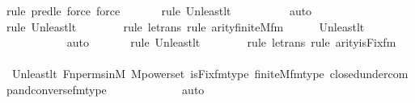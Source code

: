 \begin{isabellebody}
{\isacharparenleft}{\kern0pt}rule\ pred{\isacharunderscore}{\kern0pt}le{\isacharcomma}{\kern0pt}\ force{\isacharcomma}{\kern0pt}\ force{\isacharparenright}{\kern0pt}{\isacharplus}{\kern0pt}\isanewline
\ \ \ \ \ \ \isamarkupfalse%
{\isacharparenleft}{\kern0pt}rule\ Un{\isacharunderscore}{\kern0pt}least{\isacharunderscore}{\kern0pt}lt{\isacharparenright}{\kern0pt}{\isacharplus}{\kern0pt}\isanewline
\ \ \ \ \ \ \ \ \isamarkupfalse%
\ auto{\isacharbrackleft}{\kern0pt}{}{\isacharbrackright}{\kern0pt}\isanewline
\ \ \ \ \ \ \isamarkupfalse%
{\isacharparenleft}{\kern0pt}rule\ Un{\isacharunderscore}{\kern0pt}least{\isacharunderscore}{\kern0pt}lt{\isacharparenright}{\kern0pt}\isanewline
\ \ \ \ \ \ \ \isamarkupfalse%
{\isacharparenleft}{\kern0pt}rule\ le{\isacharunderscore}{\kern0pt}trans{\isacharcomma}{\kern0pt}\ rule\ arity{\isacharunderscore}{\kern0pt}finite{\isacharunderscore}{\kern0pt}M{\isacharunderscore}{\kern0pt}fm{\isacharparenright}{\kern0pt}\isanewline
\ \ \ \ \isamarkupfalse%
\ Un{\isacharunderscore}{\kern0pt}least{\isacharunderscore}{\kern0pt}lt\ \isanewline
\ \ \ \ \ \ \ \ \ \isamarkupfalse%
\ auto{\isacharbrackleft}{\kern0pt}{}{\isacharbrackright}{\kern0pt}\isanewline
\ \ \ \ \ \ \isamarkupfalse%
{\isacharparenleft}{\kern0pt}rule\ Un{\isacharunderscore}{\kern0pt}least{\isacharunderscore}{\kern0pt}lt{\isacharparenright}{\kern0pt}\isanewline
\ \ \ \ \ \ \ \isamarkupfalse%
{\isacharparenleft}{\kern0pt}rule\ le{\isacharunderscore}{\kern0pt}trans{\isacharcomma}{\kern0pt}\ rule\ arity{\isacharunderscore}{\kern0pt}is{\isacharunderscore}{\kern0pt}Fix{\isacharunderscore}{\kern0pt}fm{\isacharparenright}{\kern0pt}\isanewline
\ \ \ \ \isamarkupfalse%
\ Un{\isacharunderscore}{\kern0pt}least{\isacharunderscore}{\kern0pt}lt\ Fn{\isacharunderscore}{\kern0pt}perms{\isacharunderscore}{\kern0pt}in{\isacharunderscore}{\kern0pt}M\ M{\isacharunderscore}{\kern0pt}powerset\ is{\isacharunderscore}{\kern0pt}Fix{\isacharunderscore}{\kern0pt}fm{\isacharunderscore}{\kern0pt}type\ finite{\isacharunderscore}{\kern0pt}M{\isacharunderscore}{\kern0pt}fm{\isacharunderscore}{\kern0pt}type\ closed{\isacharunderscore}{\kern0pt}under{\isacharunderscore}{\kern0pt}comp{\isacharunderscore}{\kern0pt}and{\isacharunderscore}{\kern0pt}converse{\isacharunderscore}{\kern0pt}fm{\isacharunderscore}{\kern0pt}type\isanewline
\ \ \ \ \ \ \ \ \ \ \ \isamarkupfalse%
\ auto\isanewline
\ \ \ \ \isamarkupfalse%

\end{isabellebody}
